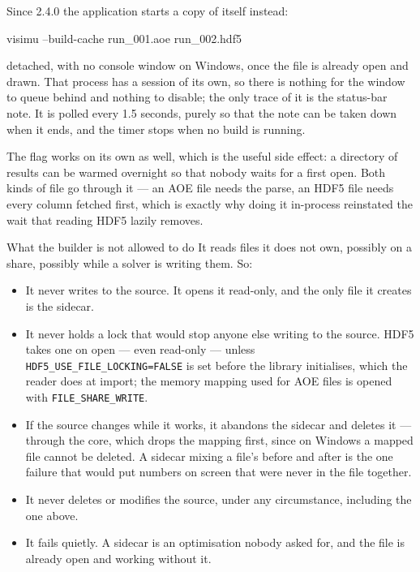 \documentclass[11pt,a4paper,oneside]{report}
\newcommand{\appver}{2.4.0}
\newcommand{\code}[1]{\texttt{#1}}
\begin{document}
Since \appver{} the application starts a copy of itself instead:

\begin{aoecode}
visimu --build-cache run_001.aoe run_002.hdf5
\end{aoecode}

detached, with no console window on Windows, once the file is already open and
drawn. That process has a session of its own, so there is nothing for the window
to queue behind and nothing to disable; the only trace of it is the status-bar
note. It is polled every 1.5 seconds, purely so that the note can be taken down
when it ends, and the timer stops when no build is running.

The flag works on its own as well, which is the useful side effect: a directory
of results can be warmed overnight so that nobody waits for a first open. Both
kinds of file go through it --- an AOE file needs the parse, an HDF5 file needs
every column fetched first, which is exactly why doing it in-process reinstated
the wait that reading HDF5 lazily removes.

\begin{aoenote}{What the builder is not allowed to do}
It reads files it does not own, possibly on a share, possibly while a solver is
writing them. So:

\begin{itemize}
  \item It never writes to the source. It opens it read-only, and the only file
        it creates is the sidecar.
  \item It never holds a lock that would stop anyone else writing to the
        source. HDF5 takes one on open --- even read-only --- unless
        \code{HDF5\_USE\_FILE\_LOCKING=FALSE} is set before the library
        initialises, which the reader does at import; the memory mapping used
        for AOE files is opened with \code{FILE\_SHARE\_WRITE}.
  \item If the source changes while it works, it abandons the sidecar and
        deletes it --- through the core, which drops the mapping first, since on
        Windows a mapped file cannot be deleted. A sidecar mixing a file's
        before and after is the one failure that would put numbers on screen
        that were never in the file together.
  \item It never deletes or modifies the source, under any circumstance,
        including the one above.
  \item It fails quietly. A sidecar is an optimisation nobody asked for, and
        the file is already open and working without it.
\end{itemize}
\end{aoenote}
\end{document}
